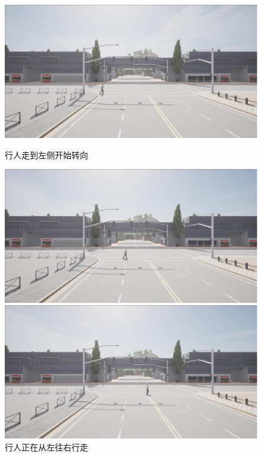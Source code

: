 \begin{figure}[H]
    \begin{minipage}{0.24\textwidth}
        \centering
        \includegraphics[width=\textwidth]{images/crossing_walking5.pdf}
        \caption{行人走到左侧开始转向}
    \end{minipage}%
    \begin{minipage}{0.24\textwidth}
        \centering
        \includegraphics[width=\textwidth]{images/crossing_walking6.pdf}
        \caption{行人正在从左往右行走}
    \end{minipage}%
    \begin{minipage}{0.24\textwidth}
        \centering
        \includegraphics[width=\textwidth]{images/crossing_walking7.pdf}

\end{minipage}
\end{figure}
